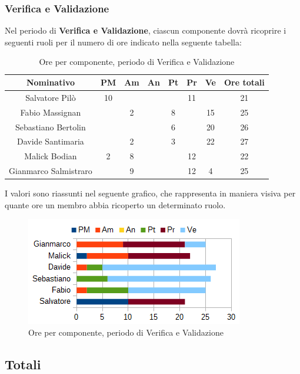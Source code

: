 		\subsubsection{Verifica e Validazione}
		Nel periodo di \textbf{Verifica e Validazione}, ciascun componente dovrà ricoprire i seguenti ruoli per il numero di ore indicato nella seguente tabella: \\
		\begin{table}[H]
		\centering
		\begin{tabular}{|c|c|c|c|c|c|c|c|}
			\hline
			\textbf{Nominativo}		& \textbf{PM}	& \textbf{Am}	& \textbf{An}	& \textbf{Pt}	& \textbf{Pr}	& \textbf{Ve}	& \textbf{Ore totali}     \\
			\hline
			Salvatore Pilò			& 10	& 		& 		&		& 11	&		& 21 \\
			Fabio Massignan			&		& 2		&		& 8		&		& 15	& 25 \\
			Sebastiano Bertolin		&		& 		& 		& 6		&		& 20	& 26 \\
			Davide Santimaria		&		& 2		& 		& 3		&		& 22	& 27 \\
			Malick Bodian			& 2		& 8		&		&		& 12	& 		& 22 \\
			Gianmarco Salmistraro	&		& 9		& 		&		& 12	& 4		& 25 \\
			\hline
		\end{tabular}
		\caption{Ore per componente, periodo di Verifica e Validazione}
		\end{table}
		I valori sono riassunti nel seguente grafico, che rappresenta in maniera visiva per quante ore un membro abbia ricoperto un determinato ruolo. \\
		\begin{figure}[H]
			\centering
			\includegraphics[scale=1]{immagini/grafici/validazione-barra.png}
			\caption{Ore per componente, periodo di Verifica e Validazione}
		\end{figure}
	\subsection{Totali}
